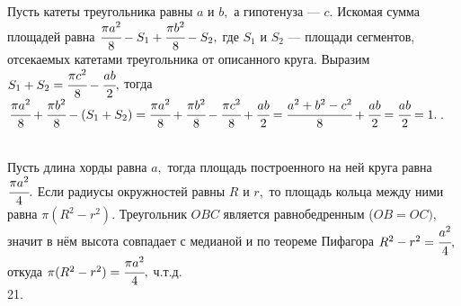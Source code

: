 \documentclass[12pt]{article}
\begin{document}
Пусть катеты треугольника равны $a$ и $b,$ а гипотенуза --- $c.$ Искомая сумма площадей равна $\cfrac{\pi a^2}{8}-S_1+\cfrac{\pi b^2}{8}-S_2,$ где $S_1$ и $S_2$ --- площади сегментов, отсекаемых катетами треугольника от описанного круга. Выразим $S_1+S_2=\cfrac{\pi c^2}{8}-\cfrac{ab}{2},$ тогда
$\cfrac{\pi a^2}{8}+\cfrac{\pi b^2}{8}-(S_1+S_2)=\cfrac{\pi a^2}{8}+\cfrac{\pi b^2}{8}-\cfrac{\pi c^2}{8}+\cfrac{ab}{2}=\cfrac{a^2+b^2-c^2}{8}+\cfrac{ab}{2}=
\cfrac{ab}{2}=1.$\newpage{}. \begin{figure}[ht!]
\end{figure}\\
Пусть длина хорды равна $a,$ тогда площадь построенного на ней круга равна $\cfrac{\pi a^2}{4}.$ Если радиусы окружностей равны $R$ и $r,$ то площадь кольца между ними равна $\pi(R^2-r^2).$ Треугольник $OBC$ является равнобедренным ($OB=OC),$ значит в нём высота совпадает с медианой и по теореме Пифагора $R^2-r^2=\cfrac{a^2}{4},$ откуда $\pi(R^2-r^2)=\cfrac{\pi a^2}{4},$ ч.т.д.\\
21. \begin{figure}[ht!]
\end{figure}\\
\end{document}
